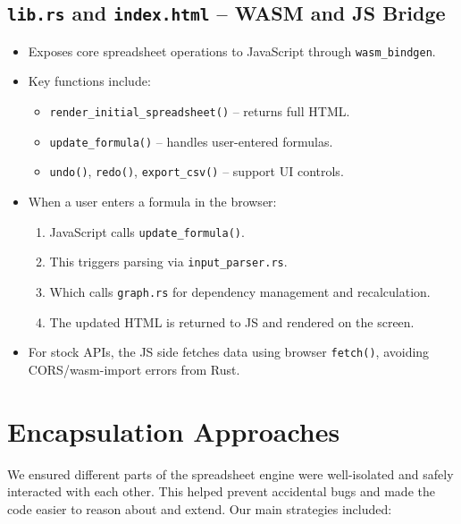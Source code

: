 \documentclass[12pt]{article}
\begin{document}
    \subsection{\texttt{lib.rs} and \texttt{index.html} – WASM and JS Bridge}
    \begin{itemize}
        \item Exposes core spreadsheet operations to JavaScript through \texttt{wasm\_bindgen}.
        \item Key functions include:
        \begin{itemize}
            \item \texttt{render\_initial\_spreadsheet()} – returns full HTML.
            \item \texttt{update\_formula()} – handles user-entered formulas.
            \item \texttt{undo()}, \texttt{redo()}, \texttt{export\_csv()} – support UI controls.
        \end{itemize}
        \item When a user enters a formula in the browser:
        \begin{enumerate}
            \item JavaScript calls \texttt{update\_formula()}.
            \item This triggers parsing via \texttt{input\_parser.rs}.
            \item Which calls \texttt{graph.rs} for dependency management and recalculation.
            \item The updated HTML is returned to JS and rendered on the screen.
        \end{enumerate}
        \item For stock APIs, the JS side fetches data using browser \texttt{fetch()}, avoiding CORS/wasm-import errors from Rust. \\
    \end{itemize}


    \section{Encapsulation Approaches}

    We ensured different parts of the spreadsheet engine were well-isolated and safely interacted with each other. This helped prevent accidental bugs and made the code easier to reason about and extend. Our main strategies included:
\end{document}
